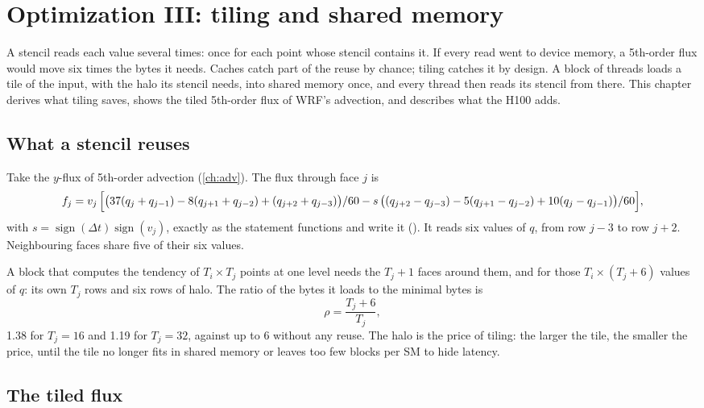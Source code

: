 \chapter{Optimization III: tiling and shared memory}\label{ch:tiling}

A stencil reads each value several times: once for each point whose stencil contains it. If every read went to device
memory, a 5th-order flux would move six times the bytes it needs. Caches catch part of the reuse by chance; tiling
catches it by design. A block of threads loads a tile of the input, with the halo its stencil needs, into shared
memory once, and every thread then reads its stencil from there. This chapter derives what tiling saves, shows the
tiled 5th-order flux of WRF's advection, and describes what the H100 adds.

\section{What a stencil reuses}

Take the $y$-flux of 5th-order advection (\cref{ch:adv}). The flux through face $j$ is
\begin{equation}
  f_j = v_j\,\Bigl[\bigl(37(q_j + q_{j-1}) - 8(q_{j+1} + q_{j-2}) + (q_{j+2} + q_{j-3})\bigr)/60
        - s\,\bigl((q_{j+2} - q_{j-3}) - 5(q_{j+1} - q_{j-2}) + 10(q_j - q_{j-1})\bigr)/60\Bigr],
  \label{eq:flux5-y}
\end{equation}
with $s = \operatorname{sign}(\Delta t)\operatorname{sign}(v_j)$, exactly as the statement functions 
and  write it (). It reads six values of $q$, from row $j-3$ to
row $j+2$. Neighbouring faces share five of their six values.

A block that computes the tendency of $T_i \times T_j$ points at one level needs the $T_j + 1$ faces around them,
and for those $T_i \times (T_j + 6)$ values of $q$: its own $T_j$ rows and six rows of halo. The ratio of the bytes it
loads to the minimal bytes is
\begin{equation}
  \rho = \frac{T_j + 6}{T_j},
\end{equation}
1.38 for $T_j = 16$ and 1.19 for $T_j = 32$, against up to 6 without any reuse. The halo is the price of tiling: the
larger the tile, the smaller the price, until the tile no longer fits in shared memory or leaves too few blocks per
SM to hide latency.

\section{The tiled flux}

